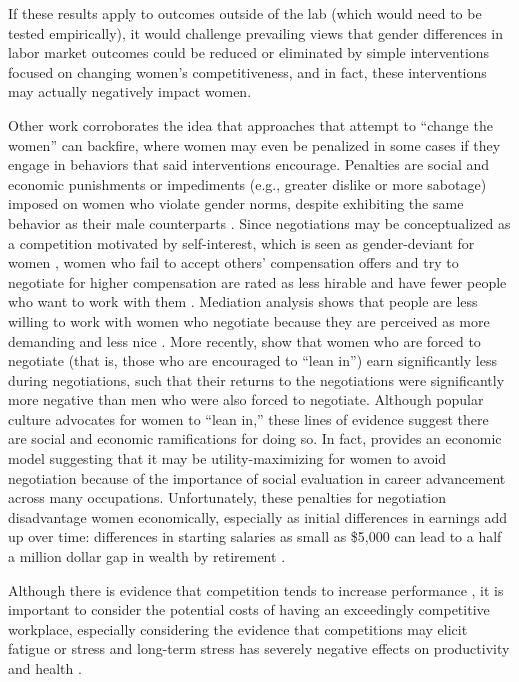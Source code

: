 \documentclass[letterpaper, nobind]{templates/ociamthesis}
\begin{document}
If these results apply to outcomes outside of the lab (which would need to be tested empirically), it would challenge prevailing views that gender differences in labor market outcomes could be reduced or eliminated by simple interventions focused on changing women's competitiveness, and in fact, these interventions may actually negatively impact women.

Other work corroborates the idea that approaches that attempt to ``change the women'' can backfire, where women may even be penalized in some cases if they engage in behaviors that said interventions encourage. Penalties are social and economic punishments or impediments (e.g., greater dislike or more sabotage) imposed on women who violate gender norms, despite exhibiting the same behavior as their male counterparts \autocite[also known as backlash, see][ for review]{Rudman2012a}. Since negotiations may be conceptualized as a competition motivated by self-interest, which is seen as gender-deviant for women \autocite{Amanatullah2010}, women who fail to accept others' compensation offers and try to negotiate for higher compensation are rated as less hirable and have fewer people who want to work with them \autocite{Bowles2007}. Mediation analysis shows that people are less willing to work with women who negotiate because they are perceived as more demanding and less nice \autocite{Bowles2007}. More recently, \textcite{Exley2020} show that women who are forced to negotiate (that is, those who are encouraged to ``lean in'') earn significantly less during negotiations, such that their returns to the negotiations were significantly more negative than men who were also forced to negotiate. Although popular culture advocates for women to ``lean in,'' these lines of evidence suggest there are social and economic ramifications for doing so. In fact, \textcite{Babcock2012} provides an economic model suggesting that it may be utility-maximizing for women to avoid negotiation because of the importance of social evaluation in career advancement across many occupations. Unfortunately, these penalties for negotiation disadvantage women economically, especially as initial differences in earnings add up over time: differences in starting salaries as small as \$5,000 can lead to a half a million dollar gap in wealth by retirement \autocite{Babcock2009}.

Although there is evidence that competition tends to increase performance \autocite{Connelly2014a,Murayama2012,Miller2019a}, it is important to consider the potential costs of having an exceedingly competitive workplace, especially considering the evidence that competitions may elicit fatigue or stress \autocite{Ryvkin2011,Zhong2018,Buckert2017} and long-term stress has severely negative effects on productivity and health \autocite{Dhabhar2014,Wallace2009,Isham2021}.
\end{document}
